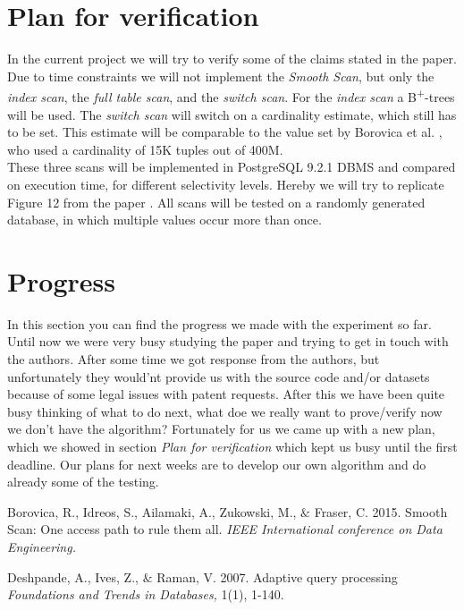 \documentclass[a4paper,11pt,titlepage]{article}
\begin{document}
\section{Plan for verification}
In the current project we will try to verify some of the claims stated in the paper.
Due to time constraints we will not implement the \emph{Smooth Scan}, but only the \emph{index scan}, the \emph{full table scan}, and the \emph{switch scan}.
For the \emph{index scan} a B\textsuperscript{+}-trees will be used. The \emph{switch scan}  will switch on a cardinality estimate, which still has to be set. This estimate will be comparable to the value set by Borovica et al. \cite{smoothscan}, who used a cardinality of 15K tuples out of 400M.
\\
These three scans will be implemented in PostgreSQL 9.2.1 DBMS and compared on execution time, for different selectivity levels.
Hereby we will try to replicate Figure 12 from the paper \cite{smoothscan}.
All scans will be tested on a randomly generated database, in which multiple values occur more than once.


\section{Progress}
In this section you can find the progress we made with the experiment so far. Until now we were very busy studying the paper and trying to get in touch with the authors. After some time we got response from the authors, but unfortunately they would'nt provide us with the source code and/or datasets because of some legal issues with patent requests. After this we have been quite busy thinking of what to do next, what doe we really want to prove/verify now we don't have the algorithm? Fortunately for us we came up with a new plan, which we showed in section \emph{Plan for verification} which kept us busy until the first deadline. Our plans for next weeks are to develop our own algorithm and do already some of the testing.

\begin{thebibliography}{9}

	 Borovica, R., Idreos, S., Ailamaki, A., Zukowski, M., $\&$ Fraser, C.
	2015.	
 	Smooth Scan: One access path to rule them all.
	\emph{IEEE International conference on Data Engineering.}

	Deshpande, A., Ives, Z., $\&$ Raman, V.
	2007.
	Adaptive query processing
	\emph{Foundations and Trends in Databases,}
	1(1), 1-140.
\end{thebibliography}
\end{document}
